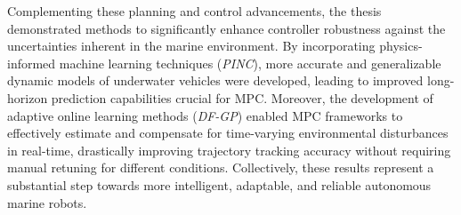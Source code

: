 Complementing these planning and control advancements, the thesis demonstrated methods to significantly enhance controller robustness against the uncertainties inherent in the marine environment. By incorporating physics-informed machine learning techniques (\textit{PINC}), more accurate and generalizable dynamic models of underwater vehicles were developed, leading to improved long-horizon prediction capabilities crucial for \ac{MPC}. Moreover, the development of adaptive online learning methods (\textit{DF-GP}) enabled \ac{MPC} frameworks to effectively estimate and compensate for time-varying environmental disturbances in real-time, drastically improving trajectory tracking accuracy without requiring manual retuning for different conditions. Collectively, these results represent a substantial step towards more intelligent, adaptable, and reliable autonomous marine robots.